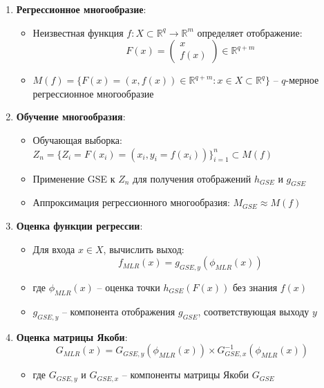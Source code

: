 \documentclass[a4paper,12pt]{article}
\begin{document}
\begin{enumerate}
    \item \textbf{Регрессионное многообразие}:
    \begin{itemize}
        \item Неизвестная функция $f: X \subset \mathbb{R}^q \rightarrow \mathbb{R}^m$ определяет отображение:
        \begin{equation}
            F(x) = \begin{pmatrix} x \\ f(x) \end{pmatrix} \in \mathbb{R}^{q+m}
        \end{equation}
        \item $M(f) = \{F(x) = (x, f(x)) \in \mathbb{R}^{q+m} : x \in X \subset \mathbb{R}^q\}$ -- $q$-мерное регрессионное многообразие
    \end{itemize}

    \item \textbf{Обучение многообразия}:
    \begin{itemize}
        \item Обучающая выборка: $Z_n = \{Z_i = F(x_i) = (x_i, y_i = f(x_i))\}_{i=1}^n \subset M(f)$
        \item Применение GSE к $Z_n$ для получения отображений $h_{GSE}$ и $g_{GSE}$
        \item Аппроксимация регрессионного многообразия: $M_{GSE} \approx M(f)$
    \end{itemize}

    \item \textbf{Оценка функции регрессии}:
    \begin{itemize}
        \item Для входа $x \in X$, вычислить выход:
        \begin{equation}
            f_{MLR}(x) = g_{GSE,y}(\phi_{MLR}(x))
        \end{equation}
        \item где $\phi_{MLR}(x)$ -- оценка точки $h_{GSE}(F(x))$ без знания $f(x)$
        \item $g_{GSE,y}$ -- компонента отображения $g_{GSE}$, соответствующая выходу $y$
    \end{itemize}

    \item \textbf{Оценка матрицы Якоби}:
    \begin{equation}
        G_{MLR}(x) = G_{GSE,y}(\phi_{MLR}(x)) \times G_{GSE,x}^{-1}(\phi_{MLR}(x))
    \end{equation}
    \begin{itemize}
        \item где $G_{GSE,y}$ и $G_{GSE,x}$ -- компоненты матрицы Якоби $G_{GSE}$
    \end{itemize}
\end{enumerate}
\end{document}

